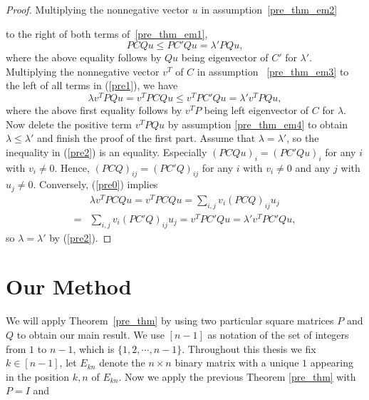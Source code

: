 \documentclass[12pt, a4paper]{article}
\theoremstyle{plain}
\theoremstyle{definition}
\begin{document}
\begin{proof}
    Multiplying the nonnegative vector $u$ in assumption~\ref{pre_thm_em2}
    
    
    to the right of both terms of~\ref{pre_thm_em1},
    \begin{equation}\label{pre1}
       PCQu\leq PC'Qu=\lambda'PQu,
    \end{equation}
 where the above equality follows by $Qu$ being eigenvector of $C'$ for $\lambda'$.
    Multiplying the nonnegative vector $v^T$ of $C$ in assumption
     ~\ref{pre_thm_em3} to the left of all terms  in (\ref{pre1}), we have
    \begin{equation}\label{pre2}
        \lambda v^TPQu=v^TPCQu\leq v^TPC'Qu=\lambda' v^TPQu,
    \end{equation}
    where the above first equality follows by $v^TP$ being
    left eigenvector of $C$ for $\lambda$.
    Now delete the positive term $v^TPQu$ by assumption \ref{pre_thm_em4} to obtain
        $\lambda\leq \lambda'$ and finish the proof of the first part.
        Assume that $\lambda=\lambda'$, so the inequality in (\ref{pre2}) is an equality.
        Especially $(PCQu)_i=(PC'Qu)_i$ for any $i$ with $v_i\not=0.$ Hence,
        $(PCQ)_{ij}=(PC'Q)_{ij}$ for any $i$ with $v_i\not=0$ and any $j$ with
        $u_j\not=0.$ Conversely, (\ref{pre0}) implies
        \begin{align*} &\lambda v^TPCQu=v^TPCQu=\sum_{i,j} v_i(PCQ)_{ij}u_j\\ =&
         \sum_{i,j} v_i(PC'Q)_{ij}u_j=v^TPC'Qu=\lambda'v^TPC'Qu,
         \end{align*} so $\lambda=\lambda'$ by (\ref{pre2}).
\end{proof}

\section{Our Method}

We will apply Theorem~\ref{pre_thm} by using two particular square matrices $P$ and $Q$ to obtain our main result. 
We use $[n-1]$ as notation of the set of integers from $1$ to $n-1$, which is $\{1,2,\cdots,n-1\}$.
Throughout this thesis we fix $k\in [n-1]$, let $E_{kn}$ denote the $n\times n$ binary matrix with a unique $1$
appearing in the position $k,n$ of $E_{kn}$. Now we apply the previous Theorem \ref{pre_thm} with $P=I$ and
\end{document}
